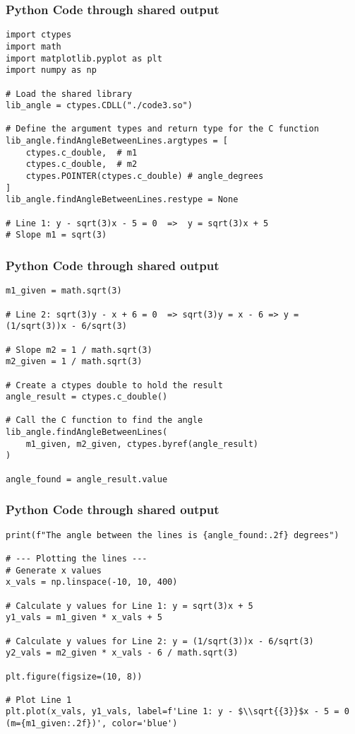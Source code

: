 \documentclass{beamer}
\begin{document}
\begin{frame}[fragile]
\frametitle{Python Code through shared output }

\begin{lstlisting}
import ctypes
import math
import matplotlib.pyplot as plt
import numpy as np

# Load the shared library
lib_angle = ctypes.CDLL("./code3.so") 

# Define the argument types and return type for the C function
lib_angle.findAngleBetweenLines.argtypes = [
    ctypes.c_double,  # m1
    ctypes.c_double,  # m2
    ctypes.POINTER(ctypes.c_double) # angle_degrees
]
lib_angle.findAngleBetweenLines.restype = None

# Line 1: y - sqrt(3)x - 5 = 0  =>  y = sqrt(3)x + 5
# Slope m1 = sqrt(3)
\end{lstlisting}
\end{frame}

\begin{frame}[fragile]
\frametitle{Python Code through shared output }

\begin{lstlisting}
m1_given = math.sqrt(3)

# Line 2: sqrt(3)y - x + 6 = 0  => sqrt(3)y = x - 6 => y = (1/sqrt(3))x - 6/sqrt(3)

# Slope m2 = 1 / math.sqrt(3)
m2_given = 1 / math.sqrt(3)

# Create a ctypes double to hold the result
angle_result = ctypes.c_double()

# Call the C function to find the angle
lib_angle.findAngleBetweenLines(
    m1_given, m2_given, ctypes.byref(angle_result)
)

angle_found = angle_result.value
\end{lstlisting}
\end{frame}

\begin{frame}[fragile]
\frametitle{Python Code through shared output }

\begin{lstlisting}
print(f"The angle between the lines is {angle_found:.2f} degrees")

# --- Plotting the lines ---
# Generate x values
x_vals = np.linspace(-10, 10, 400)

# Calculate y values for Line 1: y = sqrt(3)x + 5
y1_vals = m1_given * x_vals + 5

# Calculate y values for Line 2: y = (1/sqrt(3))x - 6/sqrt(3)
y2_vals = m2_given * x_vals - 6 / math.sqrt(3)

plt.figure(figsize=(10, 8))

# Plot Line 1
plt.plot(x_vals, y1_vals, label=f'Line 1: y - $\\sqrt{{3}}$x - 5 = 0 (m={m1_given:.2f})', color='blue')
\end{lstlisting}
\end{frame}
\end{document}
